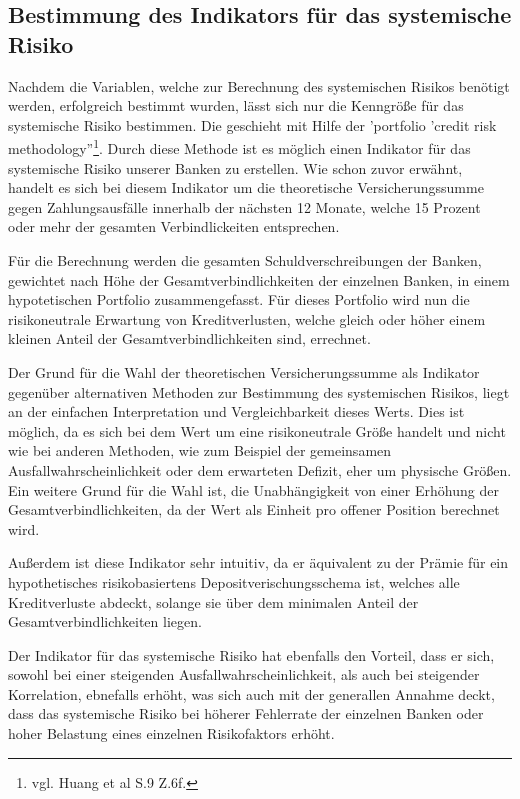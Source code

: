 \documentclass[a4paper,12pt]{scrartcl}
\begin{document}
\subsection{Bestimmung des Indikators für das systemische Risiko}
Nachdem die Variablen, welche zur Berechnung des systemischen Risikos benötigt werden, erfolgreich bestimmt wurden, lässt sich nur die Kenngröße für das systemische Risiko bestimmen. Die geschieht mit Hilfe der 'portfolio 'credit risk methodology''\footnote{vgl. Huang et al S.9 Z.6f.}. Durch diese Methode ist es möglich einen Indikator für das systemische Risiko unserer Banken zu erstellen. Wie schon zuvor erwähnt, handelt es sich bei diesem Indikator um die theoretische Versicherungssumme gegen Zahlungsausfälle innerhalb der nächsten 12 Monate, welche 15 Prozent oder mehr der gesamten Verbindlickeiten entsprechen.

Für die Berechnung werden die gesamten Schuldverschreibungen der Banken, gewichtet nach Höhe der Gesamtverbindlichkeiten der einzelnen Banken, in einem hypotetischen Portfolio zusammengefasst. Für dieses Portfolio wird nun die risikoneutrale Erwartung von Kreditverlusten, welche gleich oder höher einem kleinen Anteil der Gesamtverbindlichkeiten sind, errechnet.

Der Grund für die Wahl der theoretischen Versicherungssumme als Indikator gegenüber alternativen Methoden zur Bestimmung des systemischen Risikos, liegt an der einfachen Interpretation und Vergleichbarkeit dieses Werts. Dies ist möglich, da es sich bei dem Wert um eine risikoneutrale Größe handelt und nicht wie bei anderen Methoden, wie zum Beispiel der gemeinsamen Ausfallwahrscheinlichkeit oder dem erwarteten Defizit, eher um physische Größen.  
Ein weitere Grund für die Wahl ist, die Unabhängigkeit von einer Erhöhung der Gesamtverbindlichkeiten, da der Wert als Einheit pro offener Position berechnet wird.

Außerdem ist diese Indikator sehr intuitiv, da er äquivalent zu der Prämie für ein hypothetisches risikobasiertens Depositverischungsschema ist, welches alle Kreditverluste abdeckt, solange sie über dem minimalen Anteil der Gesamtverbindlichkeiten liegen.

Der Indikator für das systemische Risiko hat ebenfalls den Vorteil, dass er sich, sowohl bei einer steigenden Ausfallwahrscheinlichkeit, als auch bei steigender Korrelation, ebnefalls erhöht, was sich auch mit der generallen Annahme deckt, dass das systemische Risiko  bei höherer Fehlerrate der einzelnen Banken oder hoher Belastung eines einzelnen Risikofaktors erhöht.
\end{document}
